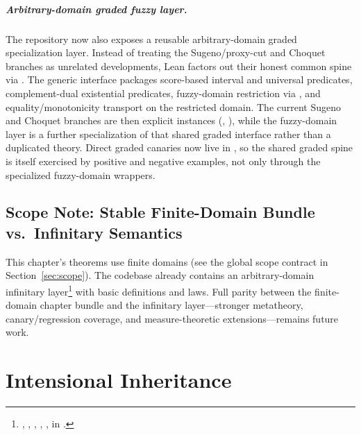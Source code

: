\documentclass[11pt,openany]{report}
\begin{document}
\paragraph{Arbitrary-domain graded fuzzy layer.}
The repository now also exposes a reusable arbitrary-domain graded
specialization layer.  Instead of treating the Sugeno/proxy-cut and
Choquet branches as unrelated developments, Lean factors out their honest
common spine via
.
The generic interface  packages
score-based interval and universal predicates, complement-dual existential
predicates, fuzzy-domain restriction via , and
equality/monotonicity transport on the restricted domain.
The current Sugeno and Choquet branches are then explicit instances
(,
), while the fuzzy-domain layer is a
further specialization of that shared graded interface rather than a
duplicated theory.  Direct graded canaries now live in
, so the
shared graded spine is itself exercised by positive and negative examples,
not only through the specialized fuzzy-domain wrappers.

\section{Scope Note: Stable Finite-Domain Bundle vs.\ Infinitary Semantics}

This chapter's theorems use finite domains (see the global scope contract
in Section~\ref{sec:scope}).  The codebase already contains an
arbitrary-domain infinitary layer\footnote{%
  , ,
  , ,
  , 
  in .}
with basic definitions and laws.  Full parity between the finite-domain
chapter bundle and the infinitary layer---stronger metatheory,
canary/regression coverage, and measure-theoretic extensions---remains
future work.


\chapter{Intensional Inheritance}
\label{ch:intensional}
\end{document}
